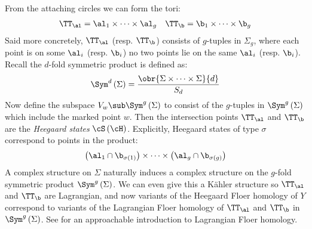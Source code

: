 \documentclass{amsproc}
\begin{document}
From the attaching circles we can form the tori:
\begin{align}
\TT_\al = \al_1 \times \cdots \times \al_g
&&
\TT_\b = \b_1 \times \cdots \times \b_g
\end{align}
Said more concretely, $\TT_\al$ (resp. $\TT_\b$) consists of
$g$-tuples in $\Sigma_g$, where each point is on some $\al_i$ (resp. $\b_i$) 
no two points lie on the same $\al_i$ (resp. $\b_i$).
Recall the $d$-fold symmetric product is defined as:
\begin{equation}
\Sym^d\left( \Sigma \right) = \frac{\obr{\Sigma \times \cdots \times \Sigma}{d}}{S_d}
\end{equation}
Now define the subspace $V_w\sub \Sym^g\left( \Sigma \right)$ 
to consist of the $g$-tuples in $\Sym^g\left( \Sigma \right)$
which include the marked point $w$.
Then the intersection points $\TT_\al$ and $\TT_\b$ are the \emph{Heegaard states}
$\cS\left( \cH \right)$.
Explicitly, Heegaard states of type $\sigma$ correspond to points in the product:
\begin{equation}
\left( \al_1 \cap \b_{\sigma\left( 1 \right)} \right) \times \cdots \times
\left( \al_g \cap \b_{\sigma\left( g \right)} \right)
\end{equation}
A complex structure on $\Sigma$ naturally induces a complex structure on the $g$-fold
symmetric product $\Sym^g\left( \Sigma \right)$. 
We can even give this a K\"ahler structure so $\TT_\al$ and $\TT_\b$ are Lagrangian, 
and now variants of the Heegaard Floer homology of $Y$ correspond to variants of the
Lagrangian Floer homology of $\TT_\al$ and $\TT_\b$ in $\Sym^g\left( \Sigma \right)$.
See \cite{auroux_fukaya} for an approachable introduction to Lagrangian Floer homology.
\end{document}
